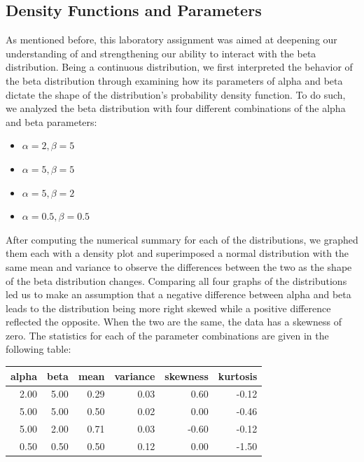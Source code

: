 \documentclass{article}\usepackage[]{graphicx}\usepackage[]{xcolor}
\begin{document}
\begin{multicols}{2}
\section{Density Functions and Parameters}
As mentioned before, this laboratory assignment was aimed at deepening our understanding of and strengthening our ability to interact with the beta distribution. Being a continuous distribution, we first interpreted the behavior of the beta distribution through examining how its parameters of alpha and beta dictate the shape of the distribution's probability density function. To do such, we analyzed the beta distribution with four different combinations of the alpha and beta parameters:
\begin{itemize}\itemsep0em
\item $\alpha = 2, \beta = 5$
\item $\alpha = 5, \beta = 5$
\item $\alpha = 5, \beta = 2$
\item $\alpha = 0.5, \beta = 0.5$
\end{itemize}


After computing the numerical summary for each of the distributions, we graphed them each with a density plot and superimposed a normal distribution with the same mean and variance to observe the differences between the two as the shape of the beta distribution changes. Comparing all four graphs of the distributions led us to make an assumption that a negative difference between alpha and beta leads to the distribution being more right skewed while a positive difference reflected the opposite. When the two are the same, the data has a skewness of zero. The statistics for each of the parameter combinations are given in the following table:

\begin{table}[H]
\centering
\begingroup\small
\begin{tabular}{rrrrrr}
  \hline
alpha & beta & mean & variance & skewness & kurtosis \\ 
  \hline
2.00 & 5.00 & 0.29 & 0.03 & 0.60 & -0.12 \\ 
  5.00 & 5.00 & 0.50 & 0.02 & 0.00 & -0.46 \\ 
  5.00 & 2.00 & 0.71 & 0.03 & -0.60 & -0.12 \\ 
  0.50 & 0.50 & 0.50 & 0.12 & 0.00 & -1.50 \\ 
   \hline
\end{tabular}
\endgroup
\label{beta_table}
\end{table}




\end{multicols}
\end{document}
